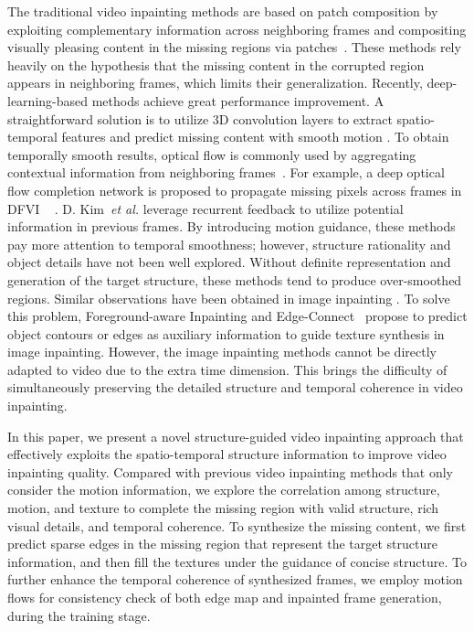 The traditional video inpainting methods are based on patch composition by exploiting complementary information across neighboring frames and compositing visually pleasing content in the missing regions via patches~\cite{patwardhan2007video,wexler2004space,newson2014video}.
% 
These methods rely heavily on the hypothesis that the missing content in the corrupted region appears in neighboring frames, which limits their generalization.
%
Recently, deep-learning-based methods achieve great performance improvement.
A straightforward solution is to utilize 3D convolution layers to extract spatio-temporal features and predict missing content with smooth motion \cite{wang2019video}.
To obtain temporally smooth results, optical flow is commonly used by aggregating contextual information from neighboring frames~\cite{Xu_2019_CVPR,Kim_2019_CVPR,Kim_2019_CVPR1}.
For example, a deep optical flow completion network is proposed to propagate missing pixels across frames in DFVI ~\cite{Xu_2019_CVPR} . D. Kim~\emph{et al.} \cite{Kim_2019_CVPR,Kim_2019_CVPR1} leverage recurrent feedback to utilize potential information in previous frames.
By introducing motion guidance, these methods pay more attention to temporal smoothness; however, structure rationality and object details have not been well explored. 
%
Without definite representation and generation of the target structure, these methods tend to produce over-smoothed regions. 
Similar observations have been obtained in image inpainting \cite{Xiong_2019_CVPR,nazeri2019edgeconnect}.
To solve this problem, Foreground-aware Inpainting \cite{Xiong_2019_CVPR} and  Edge-Connect~\cite{nazeri2019edgeconnect} propose to predict object contours or edges as auxiliary information to guide texture synthesis in image inpainting.
%
However, the image inpainting methods cannot be directly adapted to video due to the extra time dimension.
This brings the difficulty of simultaneously preserving the detailed structure and temporal coherence in video inpainting.




In this paper, we present a novel structure-guided video inpainting approach that effectively exploits the spatio-temporal structure information to improve video inpainting quality.  
Compared with previous video inpainting methods that only consider the motion information,  we explore the correlation among structure, motion, and texture to complete the missing region with valid structure, rich visual details, and temporal coherence.
%
To synthesize the missing content, we first predict sparse edges in the missing region that represent the target structure information, and then fill the textures under the guidance of concise structure.
To further enhance the temporal coherence of synthesized frames, we employ motion flows for consistency check of both edge map and inpainted frame generation, during the training stage.



